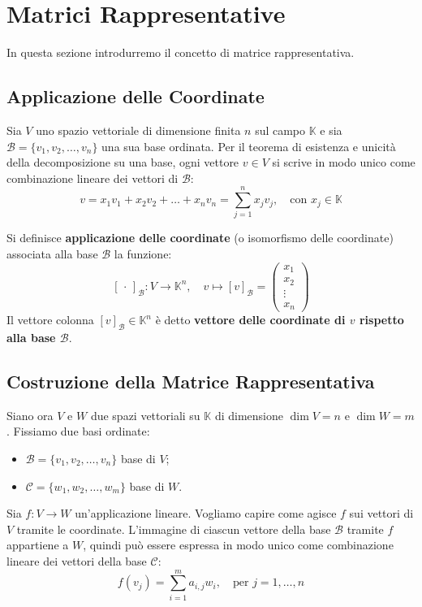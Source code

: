 \section{Matrici Rappresentative}

In questa sezione introdurremo il concetto di matrice rappresentativa.

\subsection{Applicazione delle Coordinate}

Sia $V$ uno spazio vettoriale di dimensione finita $n$ sul campo $\mathbb{K}$ e sia $\mathcal{B} = \{v_1, v_2, \dots, v_n\}$ una sua base ordinata. 
Per il teorema di esistenza e unicità della decomposizione su una base, ogni vettore $v \in V$ si scrive in modo unico come combinazione lineare dei vettori di $\mathcal{B}$:
\[
v = x_1 v_1 + x_2 v_2 + \dots + x_n v_n = \sum_{j=1}^{n} x_j v_j, \quad \text{con } x_j \in \mathbb{K}
\]

\begin{definition}
Si definisce \textbf{applicazione delle coordinate} (o isomorfismo delle coordinate) associata alla base $\mathcal{B}$ la funzione:
\[
[\,\cdot\,]_{\mathcal{B}} : V \longrightarrow \mathbb{K}^n, \quad v \longmapsto [v]_{\mathcal{B}} = \begin{pmatrix} x_1 \\ x_2 \\ \vdots \\ x_n \end{pmatrix}
\]
Il vettore colonna $[v]_{\mathcal{B}} \in \mathbb{K}^n$ è detto \textbf{vettore delle coordinate di $v$ rispetto alla base $\mathcal{B}$}.
\end{definition}

\subsection{Costruzione della Matrice Rappresentativa}
Siano ora $V$ e $W$ due spazi vettoriali su $\mathbb{K}$ di dimensione $\dim V = n$ e $\dim W = m$. 
Fissiamo due basi ordinate:
\begin{itemize}
    \item $\mathcal{B} = \{v_1, v_2, \dots, v_n\}$ base di $V$;
    \item $\mathcal{C} = \{w_1, w_2, \dots, w_m\}$ base di $W$.
\end{itemize}
Sia $f: V \to W$ un'applicazione lineare. 
Vogliamo capire come agisce $f$ sui vettori di $V$ tramite le coordinate.
L'immagine di ciascun vettore della base $\mathcal{B}$ tramite $f$ appartiene a $W$, quindi può essere espressa in modo unico come combinazione lineare dei vettori della base $\mathcal{C}$:
\[
f(v_j) = \sum_{i=1}^{m} a_{i,j} w_i, \quad \text{per } j = 1, \dots, n
\]


